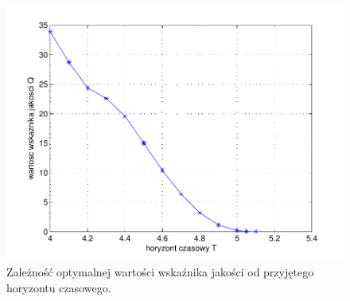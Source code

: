 \documentclass[11pt]{mwart}
\begin{document}
\begin{figure}[ht]
	\begin{centering}
	\includegraphics[scale=1.0]{QT}
	\caption{Zależność optymalnej wartości wskaźnika jakości od przyjętego horyzontu czasowego.}
	\label{fig-QT}
	\end{centering}
\end{figure}

\newpage
\end{document}
